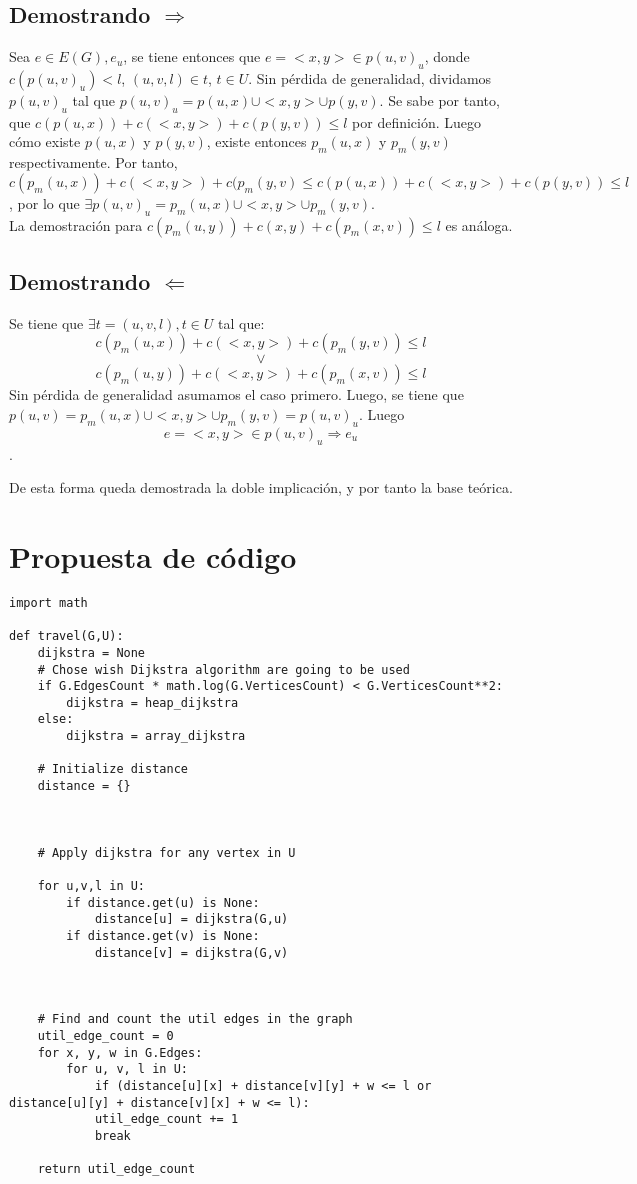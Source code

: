 \documentclass[10pt]{article}
\begin{document}
\subsection{Demostrando $\Rightarrow$ }

Sea $e \in E(G), e_u$, se tiene entonces que $e = <x,y> \in p(u,v)_u$, donde $c(p(u,v)_u)<l$, $(u,v,l) \in t$, $t \in U$. Sin pérdida de generalidad, dividamos $p(u,v)_u$ tal que $p(u,v)_u = p(u,x) \cup <x,y> \cup p(y,v)$. Se sabe por tanto, que $c(p(u,x)) + c(<x,y>) + c(p(y,v)) \leq l$ por definición. Luego cómo existe $p(u,x)$ y $p(y,v)$, existe entonces $p_m(u,x)$ y $p_m(y,v)$ respectivamente. Por tanto, $c(p_m(u,x))+c(<x,y>)+c(p_m(y,v) \leq c(p(u,x)) + c(<x,y>) + c(p(y,v)) \leq l$, por lo que $\exists p(u,v)_u = p_m(u,x) \cup <x,y> \cup p_m(y,v)$.\\

La demostración para $c(p_m(u,y)) + c(x,y) + c(p_m(x,v)) \leq l$ es análoga.

\subsection{Demostrando $\Leftarrow$}

Se tiene que $\exists t = (u,v,l), t \in U$ tal que:
$$c(p_m(u,x)) + c(<x,y>) + c(p_m(y,v)) \leq l$$
$$\lor$$
$$c(p_m(u,y)) + c(<x,y>) + c(p_m(x,v)) \leq l$$
Sin pérdida de generalidad asumamos el caso primero. Luego, se tiene que $p(u,v) = p_m(u,x) \cup <x,y> \cup p_m(y,v) = p(u,v)_u$. Luego
$$e = <x,y> \in p(u,v)_u \Rightarrow e_u$$.

De esta forma queda demostrada la doble implicación, y por tanto la base teórica.

\section{Propuesta de código}

\begin{lstlisting}[caption={Ejemplo de código Python}]
import math

def travel(G,U):
	dijkstra = None
	# Chose wish Dijkstra algorithm are going to be used
	if G.EdgesCount * math.log(G.VerticesCount) < G.VerticesCount**2:
		dijkstra = heap_dijkstra
	else:
		dijkstra = array_dijkstra
	
	# Initialize distance
	distance = {}

  

	# Apply dijkstra for any vertex in U
	
	for u,v,l in U:
		if distance.get(u) is None:
			distance[u] = dijkstra(G,u)
		if distance.get(v) is None:
			distance[v] = dijkstra(G,v)
	
	  
	
	# Find and count the util edges in the graph
	util_edge_count = 0
	for x, y, w in G.Edges:
		for u, v, l in U:
			if (distance[u][x] + distance[v][y] + w <= l or distance[u][y] + distance[v][x] + w <= l):
			util_edge_count += 1
			break
	
	return util_edge_count
\end{lstlisting}
\end{document}
